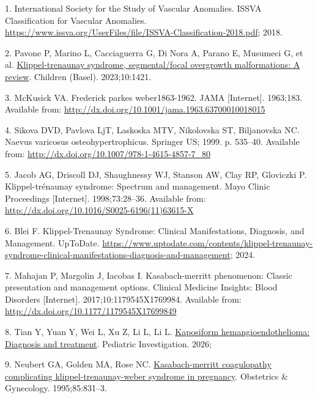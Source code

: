 \documentclass[
  letterpaper,
  DIV=11,
  numbers=noendperiod]{scrartcl}
\newlength{\cslhangindent}
\newenvironment{CSLReferences}[2] %
 {\begin{list}{}{%
  \setlength{\itemindent}{0pt}
  \setlength{\leftmargin}{0pt}
  \setlength{\parsep}{0pt}
  \ifodd #1
   \setlength{\leftmargin}{\cslhangindent}
   \setlength{\itemindent}{-1\cslhangindent}
  \fi
  \setlength{\itemsep}{#2\baselineskip}}}
 {\end{list}}
\begin{document}
\protect{}\label{refs}
\begin{CSLReferences}{0}{1}
1. International Society for the Study of Vascular Anomalies. {ISSVA
Classification for Vascular Anomalies}.
\url{https://www.issva.org/UserFiles/file/ISSVA-Classification-2018.pdf};
2018.

2. Pavone P, Marino L, Cacciaguerra G, Di Nora A, Parano E, Musumeci G,
et al. \href{https://doi.org/10.3390/children10081421}{Klippel-trenaunay
syndrome, segmental/focal overgrowth malformations: A review}. Children
(Basel). 2023;10:1421.

3. McKusick VA. Frederick parkes weber{\textemdash}1863-1962. JAMA
{[}Internet{]}. 1963;183. Available from:
\url{http://dx.doi.org/10.1001/jama.1963.63700010018015}

4. Sikova DVD, Pavlova LjT, Laskoska MTV, Nikolovska ST, Biljanovska NC.
Naevus varicosus osteohypertrophicus. Springer US; 1999. p. 535--40.
Available from: \url{http://dx.doi.org/10.1007/978-1-4615-4857-7_80}

5. Jacob AG, Driscoll DJ, Shaughnessy WJ, Stanson AW, Clay RP, Gloviczki
P. Klippel-trénaunay syndrome: Spectrum and management. Mayo Clinic
Proceedings {[}Internet{]}. 1998;73:28--36. Available from:
\url{http://dx.doi.org/10.1016/S0025-6196(11)63615-X}

6. Blei F. {Klippel-Trenaunay Syndrome: Clinical Manifestations,
Diagnosis, and Management}. UpToDate.
\url{https://www.uptodate.com/contents/klippel-trenaunay-syndrome-clinical-manifestations-diagnosis-and-management};
2024.

7. Mahajan P, Margolin J, Iacobas I. Kasabach-merritt phenomenon:
Classic presentation and management options. Clinical Medicine Insights:
Blood Disorders {[}Internet{]}. 2017;10:1179545X1769984. Available from:
\url{http://dx.doi.org/10.1177/1179545X17699849}

8. Tian Y, Yuan Y, Wei L, Xu Z, Li L, Li L.
\href{https://doi.org/10.1002/ped4.70041}{Kaposiform
hemangioendothelioma: Diagnosis and treatment}. Pediatric Investigation.
2026;

9. Neubert GA, Golden MA, Rose NC.
\href{https://doi.org/10.1016/0029-7844(94)00349-I}{Kasabach-merritt
coagulopathy complicating klippel-trenaunay-weber syndrome in
pregnancy}. Obstetrics \& Gynecology. 1995;85:831--3.


\end{CSLReferences}
\end{document}
